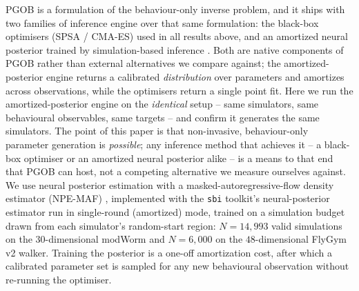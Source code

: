 \documentclass[11pt]{article}
\begin{document}
PGOB is a formulation of the behaviour-only inverse problem, and it ships with two families of inference engine over that same formulation: the black-box optimisers (SPSA / CMA-ES) used in all results above, and an amortized neural posterior trained by simulation-based inference \citep{cranmer2020frontier,goncalves2020training}. Both are native components of PGOB rather than external alternatives we compare against; the amortized-posterior engine returns a calibrated \emph{distribution} over parameters and amortizes across observations, while the optimisers return a single point fit. Here we run the amortized-posterior engine on the \emph{identical} setup -- same simulators, same behavioural observables, same targets -- and confirm it generates the same simulators. The point of this paper is that non-invasive, behaviour-only parameter generation is \emph{possible}; any inference method that achieves it -- a black-box optimiser or an amortized neural posterior alike -- is a means to that end that PGOB can host, not a competing alternative we measure ourselves against. We use neural posterior estimation with a masked-autoregressive-flow density estimator (NPE-MAF) \citep{papamakarios2017maf}, implemented with the \texttt{sbi} toolkit's neural-posterior estimator \citep{tejero2020sbi} run in single-round (amortized) mode, trained on a simulation budget drawn from each simulator's random-start region: $N{=}14{,}993$ valid simulations on the $30$-dimensional modWorm and $N{=}6{,}000$ on the $48$-dimensional FlyGym v2 walker. Training the posterior is a one-off amortization cost, after which a calibrated parameter set is sampled for any new behavioural observation without re-running the optimiser.
\end{document}
